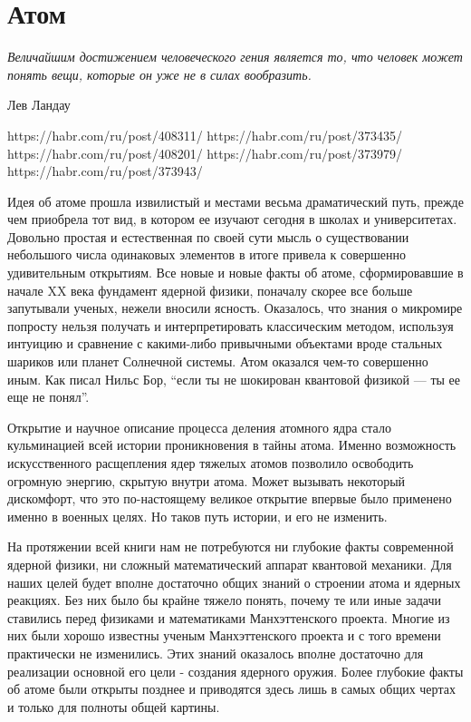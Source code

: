 \chapter{Атом}\label{ch:atom}

\epigraph{\emph{Величайшим достижением человеческого гения является то, что человек может понять вещи, которые он уже не в силах вообразить.}}
{Лев Ландау}

https://habr.com/ru/post/408311/
https://habr.com/ru/post/373435/
https://habr.com/ru/post/408201/
https://habr.com/ru/post/373979/
https://habr.com/ru/post/373943/


Идея об атоме прошла извилистый и местами весьма драматический путь, прежде чем приобрела тот вид, в котором ее изучают сегодня в школах и университетах.
Довольно простая и естественная по своей сути мысль о существовании небольшого числа одинаковых элементов в итоге привела к совершенно удивительным открытиям.
Все новые и новые факты об атоме, сформировавшие в начале XX века фундамент ядерной физики, поначалу скорее все больше запутывали ученых, нежели вносили ясность.
Оказалось, что знания о микромире попросту нельзя получать и интерпретировать классическим методом, используя интуицию и сравнение с какими-либо привычными объектами вроде стальных шариков или планет Солнечной системы.
Атом оказался чем-то совершенно иным.
Как писал Нильс Бор, ``если ты не шокирован квантовой физикой — ты ее еще не понял''.

Открытие и научное описание процесса деления атомного ядра стало кульминацией всей истории проникновения в тайны атома. 
Именно возможность искусственного расщепления ядер тяжелых атомов позволило освободить огромную энергию, скрытую внутри атома.
Может вызывать некоторый дискомфорт, что это по-настоящему великое открытие впервые было применено именно в военных целях.
Но таков путь истории, и его не изменить.

На протяжении всей книги нам не потребуются ни глубокие факты современной ядерной физики, ни сложный математический аппарат квантовой механики.
Для наших целей будет вполне достаточно общих знаний о строении атома и ядерных реакциях.
Без них было бы крайне тяжело понять, почему те или иные задачи ставились перед физиками и математиками Манхэттенского проекта.
Многие из них были хорошо известны ученым Манхэттенского проекта и с того времени практически не изменились.  
Этих знаний оказалось вполне достаточно для реализации основной его цели - создания ядерного оружия.
Более глубокие факты об атоме были открыты позднее и приводятся здесь лишь в самых общих чертах и только для полноты общей картины.


